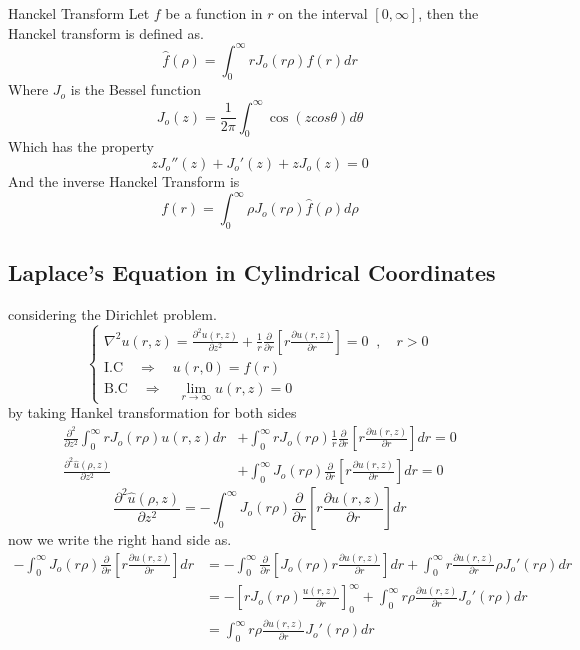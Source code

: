 \documentclass[]{article}
\begin{document}
\begin{enrichment*}{Hanckel Transform}
    Let $f$ be a function in $r$ on the interval $[0,\infty]$, then the Hanckel transform is defined as.
    \[
        \hat{f}(\rho) = \int_{0}^{\infty} r J_o(r\rho) f(r) dr    
    \]
    Where $J_o$ is the Bessel function 
    \[
        J_o(z) = \frac{1}{2\pi}\int_{0}^{\infty} \cos(zcos\theta)d\theta     
    \]
    Which has the property 
    \[
        z J_o''(z) + J_o'(z)+ zJ_o(z) = 0     
    \]
    And the inverse Hanckel Transform is 
    \[
        f(r) = \int_{0}^{\infty} \rho J_o(r\rho) \hat{f}(\rho) d\rho    
    \]
\end{enrichment*}
\setcounter{equation}{0}
\subsection{Laplace's Equation in Cylindrical Coordinates}
considering the Dirichlet problem.
\[
    \begin{cases}
        \displaystyle \nabla^2 u(r,z) = \frac{\partial^2 u(r,z)}{\partial z^2} + \frac{1}{r}\frac{\partial}{\partial r}\left[r\frac{\partial u(r,z)}{\partial r}\right] = 0 \;\; , \quad r >0
        \\
        \text{I.C} \quad \Longrightarrow \quad u(r,0) = f(r)
        \\
        \text{B.C} \quad \Longrightarrow \quad \lim_{r\rightarrow\infty} u(r,z) =0
    \end{cases}
\]
by taking Hankel transformation for both sides
\begin{align*}
\frac{\partial^2 }{\partial z^2}\int_{0}^{\infty} rJ_o(r\rho)u(r,z) dr &+ \int_{0}^{\infty}rJ_o(r\rho)\frac{1}{r}\frac{\partial}{\partial r}\left[r\frac{\partial u(r,z)}{\partial r}\right]dr = 0
\\
\frac{\partial^2 \hat{u}(\rho,z)}{\partial z^2} &+ \int_{0}^{\infty}J_o(r\rho)\frac{\partial}{\partial r}\left[r\frac{\partial u(r,z)}{\partial r}\right]dr = 0
\end{align*}
\[
    \frac{\partial^2 \hat{u}(\rho,z)}{\partial z^2}  = -\int_{0}^{\infty}J_o(r\rho)\frac{\partial}{\partial r}\left[r\frac{\partial u(r,z)}{\partial r}\right]dr    
\]
now we write the right hand side as.
\begin{align*}
-\int_{0}^{\infty}J_o(r\rho)\frac{\partial}{\partial r}\left[r\frac{\partial u(r,z)}{\partial r}\right]dr &= -\int_{0}^{\infty}\frac{\partial}{\partial r}\left[J_o(r\rho)r\frac{\partial u(r,z)}{\partial r}\right]dr + \int_{0}^{\infty} r\frac{\partial u(r,z)}{\partial r} \rho J_o'(r\rho)dr
\\
&= -\left[rJ_o(r\rho)\frac{u(r,z)}{\partial r}\right]_{0}^{\infty} + \int_{0}^{\infty} r\rho\frac{\partial u(r,z)}{\partial r} J_o'(r\rho)dr
\\
&= \int_{0}^{\infty} r\rho\frac{\partial u(r,z)}{\partial r} J_o'(r\rho)dr
\end{align*}
\end{document}
